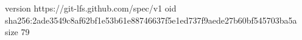 version https://git-lfs.github.com/spec/v1
oid sha256:2ade3549c8af62bf1e53b61e88746637f5e1ed737f9aede27b60bf545703ba5a
size 79
